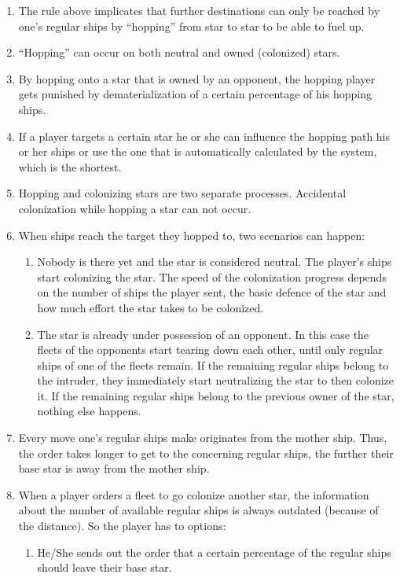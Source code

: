 \begin{enumerate}
	\item The rule above implicates	that further destinations can only be reached by one's regular ships by ``hopping'' from star to star to be able to fuel up.
	\item ``Hopping'' can occur on both neutral and owned (colonized) stars.
	\item By hopping onto a star that is owned by an opponent, the hopping player gets punished by dematerialization of a certain percentage of his hopping ships.
	\item If a player targets a certain star he or she can influence the hopping path his or her ships or use the one that is automatically calculated by the system, which is the shortest.
	\item Hopping and colonizing stars are two separate processes. Accidental colonization while hopping a star can not occur.
	\item When ships reach the target they hopped to, two scenarios can happen:
		\begin{enumerate}[label=\alph*)]
			\item Nobody is there yet and the star is considered neutral. The player's ships start colonizing the star. The speed of the colonization progress depends on the number of ships the player sent, the basic defence of the star and how much effort the star takes to be colonized.
			\item The star is already under possession of an opponent. In this case the fleets of the opponents start tearing down each other, until only regular ships of one of the fleets remain. If the remaining regular ships belong to the intruder, they immediately start neutralizing the star to then colonize it. If the remaining regular ships belong to the previous owner of the star, nothing else happens.
		\end{enumerate}
		\item Every move one's regular ships make originates from the mother ship. Thus, the order takes longer to get to the concerning regular ships, the further their base star is away from the mother ship.
	\item When a player orders a fleet to go colonize another star, the information about the number of available regular ships is always outdated (because of the distance). So the player has to options:
		\begin{enumerate}[label=\alph*)]
			\item He/She sends out the order that a certain percentage of the regular ships should leave their base star.

\end{enumerate}
\end{enumerate}
